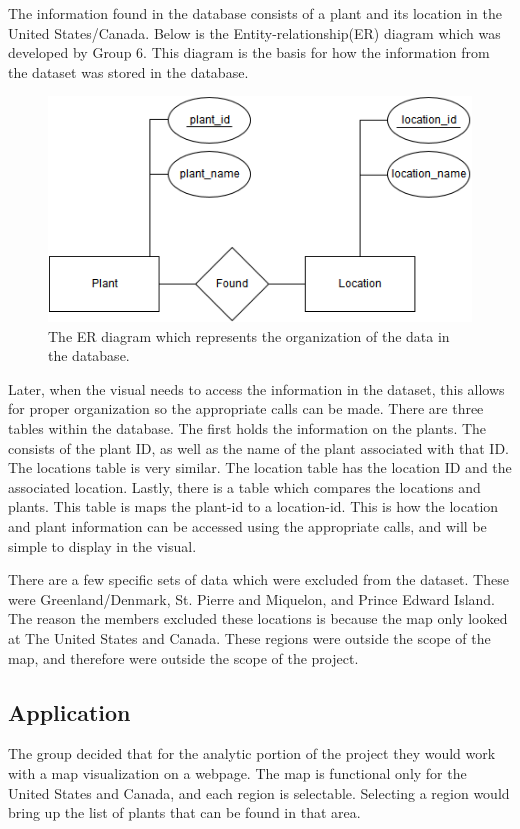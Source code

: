 \documentclass{Group6_Phase2}
\begin{document}
 The information found in the database consists of a plant and its location in the United States/Canada. Below is the Entity-relationship(ER) diagram which was developed by Group 6. This diagram is the basis for how the information from the dataset was stored in the database.

\begin{figure}[htb]
	\centering
	\includegraphics[scale=0.5]{FinalProject_ERdiagram.png}
	\caption{The ER diagram which represents the organization of the data in the database.}
\end{figure}

Later, when the visual needs to access the information in the dataset, this allows for proper organization so the appropriate calls can be made. There are three tables within the database. The first holds the information on the plants. The consists of the plant ID, as well as the name of the plant associated with that ID. The locations table is very similar. The location table has the location ID and the associated location. Lastly, there is a table which compares the locations and plants. This table is maps the plant-id to a location-id. This is how the location and plant information can be accessed using the appropriate calls, and will be simple to display in the visual.

There are a few specific sets of data which were excluded from the dataset. These were Greenland/Denmark, St. Pierre and Miquelon, and Prince Edward Island. The reason the members excluded these locations is because the map only looked at The United States and Canada. These regions were outside the scope of the map, and therefore were outside the scope of the project. 


\subsection{Application}
The group decided that for the analytic portion of the project they would work with a map visualization on a webpage. The map is functional only for the United States and Canada, and each region is selectable. Selecting a region would bring up the list of plants that can be found in that area. 
\end{document}
